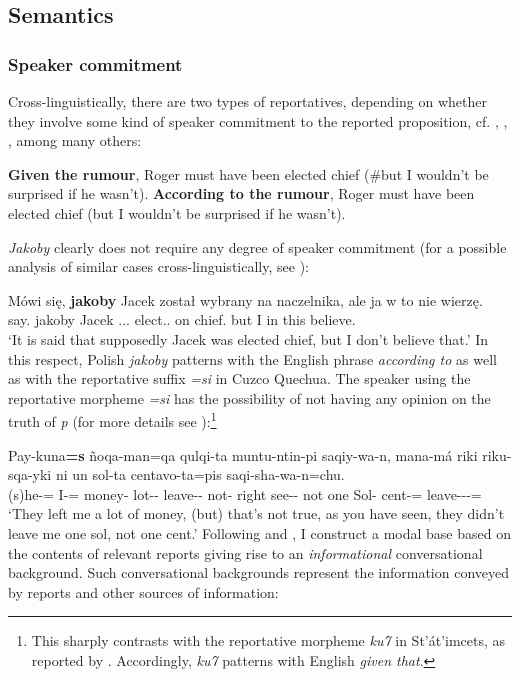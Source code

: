 \documentclass[output=paper
,modfonts
,nonflat]{langsci/langscibook}
\begin{document}
\subsection{Semantics}

\subsubsection{Speaker commitment}
Cross-linguistically, there are two types of reportatives, depending on whether they involve some kind of speaker commitment to the reported proposition, cf. \textcite{Faller2011}, \textcite{Kratzer2012}, \textcite{Murray2017}, among many others:

\ea	\ea	\textbf{Given the rumour}, Roger must have been elected chief (\#but I wouldn't be surprised if he wasn't).
	\ex	\textbf{According to the rumour}, Roger must have been elected chief (but I wouldn't be surprised if he wasn't). 
\z\z

\noindent \emph{Jakoby} clearly does not require any degree of speaker commitment (for a possible analysis of similar cases cross-linguistically, see \textcite{AnderBois2014}):

\ea \gll Mówi się, \textbf{jakoby} Jacek został wybrany na naczelnika, ale ja w to nie wierzę. \\
		say.{\thirdperson}{\sg} {} jakoby Jacek  {\passaux}.{\lptcp}.{\sg}.{\masc} elect.{\ptcp}.{\masc} on chief.{\acc} but I in this {\negation} believe.{\firstperson}{\sg} \\
\glt	`It is said that supposedly Jacek was elected chief, but I don't believe that.' 
\z
In this respect, Polish \emph{jakoby} patterns with the English phrase \emph{according to} as well as with the reportative suffix \emph{=si} in Cuzco Quechua. The speaker using the reportative morpheme \emph{=si} has the possibility of not having any opinion on the truth of \emph{p} (for more details see \textcite{Faller2011}):\footnote{
This sharply contrasts with the reportative morpheme \emph{ku7} in St'át'imcets, as reported by \textcite{Lisa-Matthewson-Davis2017}. Accordingly, \emph{ku7} patterns with English \emph{given that}.
}

\ea \gll Pay-kuna\textbf{=s} ñoqa-man=qa qulqi-ta muntu-ntin-pi saqiy-wa-n, mana-má riki riku-sqa-yki ni un sol-ta centavo-ta=pis saqi-sha-wa-n=chu. \\
		(s)he-{\pl}={\rep} I-{\illa}={\topi} money-{\acc} lot-{\incl}-{\LOC} leave-{\firstperson}{\object}-{\thirdperson} not-{\impr} right see-{\ptcp}-{\secondperson} not one Sol-{\acc} cent-{\acc}={\add} leave-{\prog}-{\firstperson}{\object}-{\thirdperson}={\negation} \\
\glt	 `They left me a lot of money, (but) that's not true, as you have seen, they didn't leave me one sol, not one cent.' 
\z
Following \textcite{Kratzer2012} and \textcite{Faller2011}, I construct a modal base based on the contents of relevant reports giving rise to an \emph{informational} conversational background. Such conversational backgrounds represent the information conveyed by reports and other sources of information:
\end{document}
